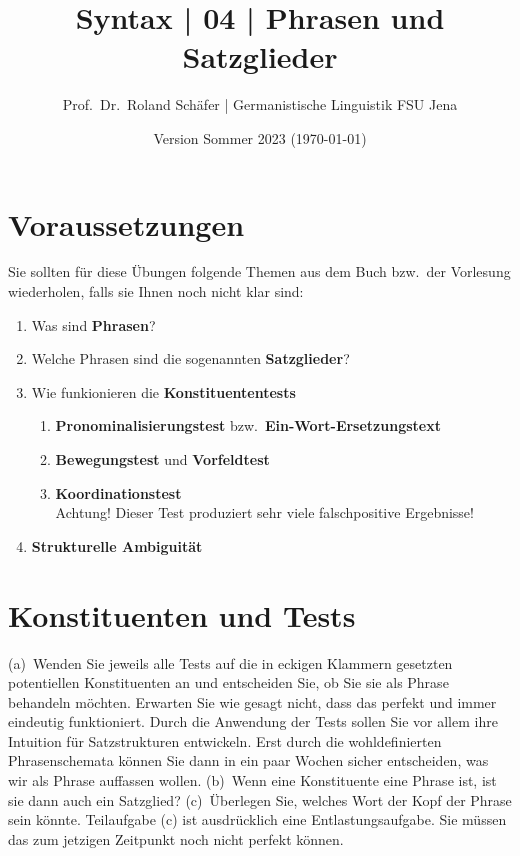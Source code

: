 \documentclass[12pt,a4paper,twoside]{article}
\author{Prof.\ Dr.\ Roland Schäfer | Germanistische Linguistik FSU Jena}
\title{Syntax | 04 | Phrasen und Satzglieder}
\date{Version Sommer 2023 (\today)}
\newcommand{\Lf}{
  \setlength{\itemsep}{1pt}
  \setlength{\parskip}{0pt}
  \setlength{\parsep}{0pt}
}
\begin{document}
\maketitle

\section*{Voraussetzungen}

Sie sollten für diese Übungen folgende Themen aus dem Buch bzw.\ der Vorlesung wiederholen, falls sie Ihnen noch nicht klar sind:

\begin{enumerate}\Lf
  \item Was sind \textbf{Phrasen}?
  \item Welche Phrasen sind die sogenannten \textbf{Satzglieder}?
  \item Wie funkionieren die \textbf{Konstituententests}
    \begin{enumerate}\Lf
      \item \textbf{Pronominalisierungstest} bzw.\ \textbf{Ein-Wort-Ersetzungstext}
      \item \textbf{Bewegungstest} und \textbf{Vorfeldtest}
      \item \textbf{Koordinationstest}\\
        Achtung! Dieser Test produziert sehr viele falschpositive Ergebnisse!
    \end{enumerate}
  \item \textbf{Strukturelle Ambiguität}
\end{enumerate}

\section{Konstituenten und Tests}

(a)~Wenden Sie jeweils alle Tests auf die in eckigen Klammern gesetzten potentiellen Konstituenten an und entscheiden Sie, ob Sie sie als Phrase behandeln möchten.
Erwarten Sie wie gesagt nicht, dass das perfekt und immer eindeutig funktioniert.
Durch die Anwendung der Tests sollen Sie vor allem ihre Intuition für Satzstrukturen entwickeln.
Erst durch die wohldefinierten Phrasenschemata können Sie dann in ein paar Wochen sicher entscheiden, was wir als Phrase auffassen wollen.
(b)~Wenn eine Konstituente eine Phrase ist, ist sie dann auch ein Satzglied?
(c)~Überlegen Sie, welches Wort der Kopf der Phrase sein könnte.
Teilaufgabe (c) ist ausdrücklich eine Entlastungsaufgabe.
Sie müssen das zum jetzigen Zeitpunkt noch nicht perfekt können.
\end{document}
